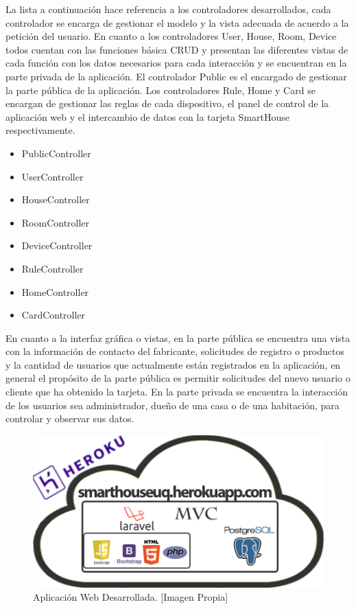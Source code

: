 La lista a continuación hace referencia a los controladores desarrollados, cada controlador se encarga de gestionar el modelo y la vista adecuada de acuerdo a la petición del usuario. En cuanto a los controladores User, House, Room, Device todos cuentan con las funciones básica CRUD y presentan las diferentes vistas de cada función con los datos necesarios para cada interacción y se encuentran en la parte privada de la aplicación. El controlador Public es el encargado de gestionar la parte pública de la aplicación. Los controladores Rule, Home y Card se encargan de gestionar las reglas de cada dispositivo, el panel de control de la aplicación web y el intercambio de datos con la tarjeta SmartHouse respectivamente.\\

\begin{itemize}
	\item PublicController
	\item UserController
	\item HouseController
	\item RoomController
	\item DeviceController
	\item RuleController
	\item HomeController
	\item CardController
\end{itemize}

En cuanto a la interfaz gráfica o vistas, en la parte pública se encuentra una vista con la información de contacto del fabricante, solicitudes de registro o productos y la cantidad de usuarios que actualmente están registrados en la aplicación, en general el propósito de la parte pública es permitir solicitudes del nuevo usuario o cliente que ha obtenido la tarjeta. En la parte privada se encuentra la interacción de los usuarios sea administrador, dueño de una casa o de una habitación, para controlar y observar sus datos.\\

\begin{figure}[H]
	\centering
	\caption[Aplicación Web Desarrollada.]{Aplicación Web Desarrollada. [Imagen Propia]}
	\label{fig:B_appweb}
	\includegraphics[width=0.5\linewidth]{Imagenes/B_ImplAPPweb}
\end{figure}

